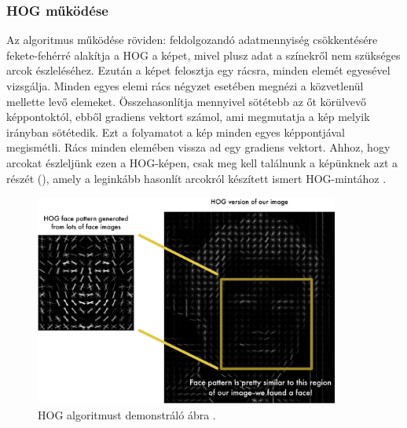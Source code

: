 \subsubsection{HOG működése}
Az algoritmus működése röviden: feldolgozandó adatmennyiség csökkentésére fekete-fehérré alakítja a HOG a képet, mivel plusz adat a színekről nem szükséges arcok észleléséhez. Ezután a képet felosztja egy rácsra, minden elemét egyesével vizsgálja. Minden egyes elemi rács négyzet esetében megnézi a közvetlenül mellette levő elemeket. Összehasonlítja mennyivel sötétebb az őt körülvevő képpontoktól, ebből gradiens vektort számol, ami megmutatja a kép melyik irányban sötétedik. Ezt a folyamatot a kép minden egyes képpontjával megismétli. Rács minden elemében vissza ad egy gradiens vektort.
Ahhoz, hogy arcokat észleljünk ezen a HOG-képen, csak meg kell találnunk a képünknek azt a részét (), amely a leginkább hasonlít arcokról készített ismert HOG-mintához \cite{artc_gold}\cite{artc35}.
\begin{figure}[!ht]
    \centering
    \includegraphics[width=100mm, keepaspectratio]{03_images/hog.png}
    \caption{HOG algoritmust demonstráló ábra \cite{artc_gold}.}
    \label{fig:hog}
\end{figure}

